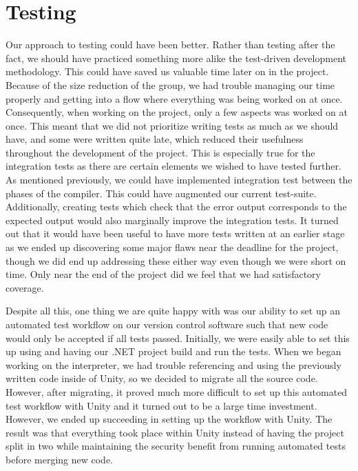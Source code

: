 \section{Testing}
Our approach to testing could have been better. Rather than testing after the fact, we should have practiced something more alike the test-driven development methodology. This could have saved us valuable time later on in the project.
Because of the size reduction of the group, we had trouble managing our time properly and getting into a flow where everything was being worked on at once.
Consequently, when working on the project, only a few aspects was worked on at once.
This meant that we did not prioritize writing tests as much as we should have, and some were written quite late, which reduced their usefulness throughout the development of the project. This is especially true for the integration tests as there are certain elements we wished to have tested further. 
As mentioned previously, we could have implemented integration test between the phases of the compiler. This could have augmented our current test-suite. Additionally, creating tests which check that the error output corresponds to the expected output would also marginally improve the integration tests.
It turned out that it would have been useful to have more tests written at an earlier stage as we ended up discovering some major flaws near the deadline for the project, though we did end up addressing these either way even though we were short on time. 
Only near the end of the project did we feel that we had satisfactory coverage.

Despite all this, one thing we are quite happy with was our ability to set up an automated test workflow on our version control software such that new code would only be accepted if all tests passed.
Initially, we were easily able to set this up using and having our .NET project build and run the tests.
When we began working on the interpreter, we had trouble referencing and using the previously written code inside of Unity, so we decided to migrate all the source code.
However, after migrating, it proved much more difficult to set up this automated test workflow with Unity and it turned out to be a large time investment.
However, we ended up succeeding in setting up the workflow with Unity.
The result was that everything took place within Unity instead of having the project split in two while maintaining the security benefit from running automated tests before merging new code.
